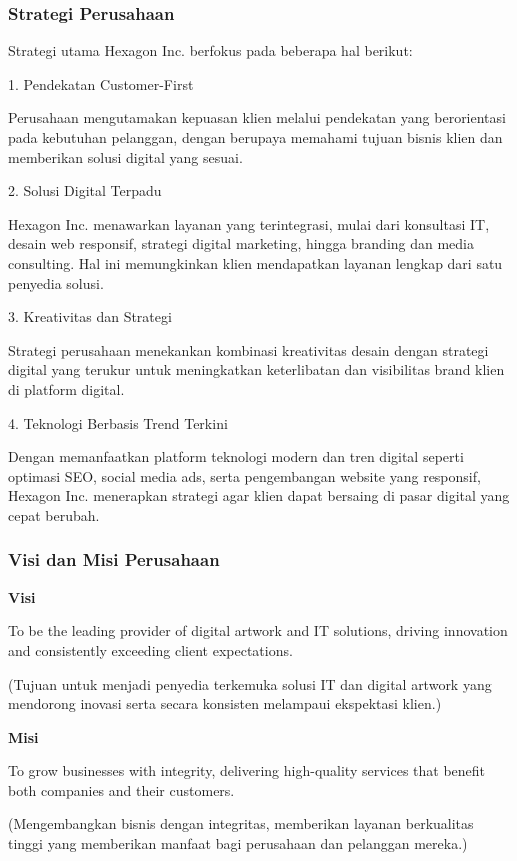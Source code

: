\subsubsection{Strategi Perusahaan}

Strategi utama Hexagon Inc. berfokus pada beberapa hal berikut:

1. Pendekatan Customer-First

Perusahaan mengutamakan kepuasan klien melalui pendekatan yang berorientasi pada kebutuhan pelanggan, dengan berupaya memahami tujuan bisnis klien dan memberikan solusi digital yang sesuai.

2. Solusi Digital Terpadu

Hexagon Inc. menawarkan layanan yang terintegrasi, mulai dari konsultasi IT, desain web responsif, strategi digital marketing, hingga branding dan media consulting. Hal ini memungkinkan klien mendapatkan layanan lengkap dari satu penyedia solusi.

3. Kreativitas dan Strategi

Strategi perusahaan menekankan kombinasi kreativitas desain dengan strategi digital yang terukur untuk meningkatkan keterlibatan dan visibilitas brand klien di platform digital.

4. Teknologi Berbasis Trend Terkini

Dengan memanfaatkan platform teknologi modern dan tren digital seperti optimasi SEO, social media ads, serta pengembangan website yang responsif, Hexagon Inc. menerapkan strategi agar klien dapat bersaing di pasar digital yang cepat berubah.


\subsubsection{Visi dan Misi Perusahaan}

\textbf{Visi}

To be the leading provider of digital artwork and IT solutions, driving innovation and consistently exceeding client expectations.

(Tujuan untuk menjadi penyedia terkemuka solusi IT dan digital artwork yang mendorong inovasi serta secara konsisten melampaui ekspektasi klien.)

\textbf{Misi}

To grow businesses with integrity, delivering high-quality services that benefit both companies and their customers.

(Mengembangkan bisnis dengan integritas, memberikan layanan berkualitas tinggi yang memberikan manfaat bagi perusahaan dan pelanggan mereka.)


